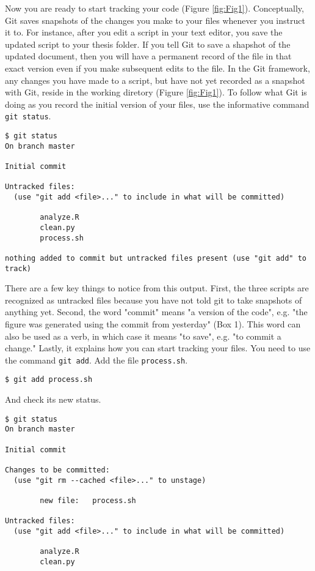 Now you are ready to start tracking your code (Figure \ref{fig:Fig1}).
Conceptually, Git saves snapshots of the changes you make to your files whenever you instruct it to.
For instance, after you edit a script in your text editor, you save the updated script to your thesis folder.
If you tell Git to save a shapshot of the updated document, then you will have a permanent record of the file in that exact version even if you make subsequent edits to the file.
In the Git framework, any changes you have made to a script, but have not yet recorded as a snapshot with Git, reside in the working diretory (Figure \ref{fig:Fig1}).
To follow what Git is doing as you record the initial version of your files, use the informative command \verb|git status|.

\begin{lstlisting}
$ git status
On branch master

Initial commit

Untracked files:
  (use "git add <file>..." to include in what will be committed)

        analyze.R
        clean.py
        process.sh

nothing added to commit but untracked files present (use "git add" to track)
\end{lstlisting}

There are a few key things to notice from this output.
First, the three scripts are recognized as untracked files because you have not told git to take snapshots of anything yet.
Second, the word "commit" means "a version of the code", e.g. "the figure was generated using the commit from yesterday" (Box 1).
This word can also be used as a verb, in which case it means "to save", e.g. "to commit a change."
Lastly, it explains how you can start tracking your files.
You need to use the command \verb|git add|.
Add the file \verb|process.sh|.

\begin{lstlisting}
$ git add process.sh
\end{lstlisting}

And check its new status.

\begin{lstlisting}
$ git status
On branch master

Initial commit

Changes to be committed:
  (use "git rm --cached <file>..." to unstage)

        new file:   process.sh

Untracked files:
  (use "git add <file>..." to include in what will be committed)

        analyze.R
        clean.py
\end{lstlisting}

